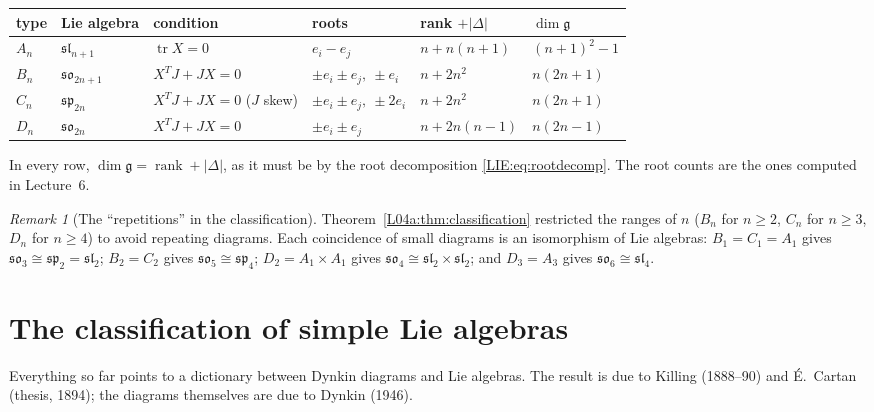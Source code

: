 \documentclass[11pt,openany]{book}
\theoremstyle{plain}
\theoremstyle{definition}
\theoremstyle{remark}
\newtheorem{remark}[theorem]{Remark}
\newcommand{\abs}[1]{\left\lvert #1 \right\rvert}
\begin{document}
\begin{center}
\renewcommand{\arraystretch}{1.25}
\begin{tabular}{llllll}
\toprule
type & Lie algebra & condition & roots & rank $+\abs{\Delta}$ & $\dim\mathfrak g$\\
\midrule
$A_n$ & $\mathfrak{sl}_{n+1}$ & $\operatorname{tr}X=0$ & $e_i-e_j$ & $n+n(n+1)$ & $(n+1)^2-1$\\
$B_n$ & $\mathfrak{so}_{2n+1}$ & $X^TJ+JX=0$ & $\pm e_i\pm e_j,\ \pm e_i$ & $n+2n^2$ & $n(2n+1)$\\
$C_n$ & $\mathfrak{sp}_{2n}$ & $X^TJ+JX=0$ ($J$ skew) & $\pm e_i\pm e_j,\ \pm2e_i$ & $n+2n^2$ & $n(2n+1)$\\
$D_n$ & $\mathfrak{so}_{2n}$ & $X^TJ+JX=0$ & $\pm e_i\pm e_j$ & $n+2n(n-1)$ & $n(2n-1)$\\
\bottomrule
\end{tabular}
\end{center}
In every row, $\dim\mathfrak g=\operatorname{rank}+\abs{\Delta}$, as it must be by the root decomposition
\eqref{LIE:eq:rootdecomp}. The root counts are the ones computed in Lecture~6.

\begin{remark}[The ``repetitions'' in the classification]
Theorem~\ref{L04a:thm:classification} restricted the ranges of $n$ ($B_n$ for $n\ge2$, $C_n$ for $n\ge3$, $D_n$ for $n\ge4$) to
avoid repeating diagrams. Each coincidence of small diagrams is an isomorphism of Lie algebras:
$B_1=C_1=A_1$ gives $\mathfrak{so}_3\cong\mathfrak{sp}_2=\mathfrak{sl}_2$; $B_2=C_2$ gives
$\mathfrak{so}_5\cong\mathfrak{sp}_4$; $D_2=A_1\times A_1$ gives $\mathfrak{so}_4\cong\mathfrak{sl}_2\times\mathfrak{sl}_2$; and
$D_3=A_3$ gives $\mathfrak{so}_6\cong\mathfrak{sl}_4$.
\end{remark}

\section{The classification of simple Lie algebras}
\label{LIE:sec:classification}

Everything so far points to a dictionary between Dynkin diagrams and Lie algebras. The result is
due to Killing (1888--90) and \'E.~Cartan (thesis, 1894); the diagrams themselves are due to
Dynkin (1946).
\end{document}

